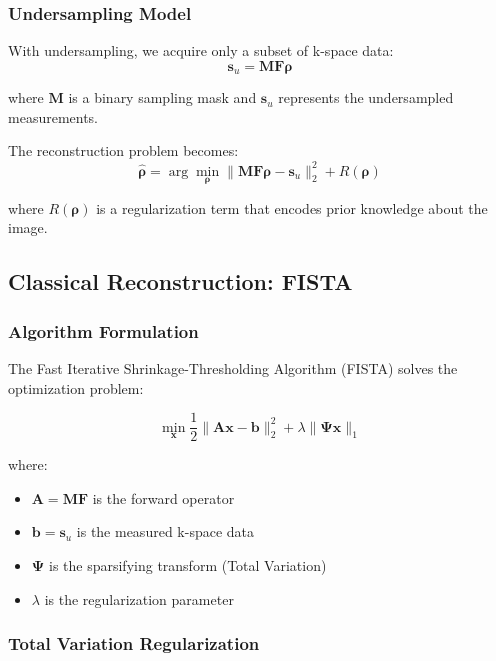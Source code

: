 \documentclass[11pt,a4paper]{article}
\begin{document}
\subsubsection{Undersampling Model}

With undersampling, we acquire only a subset of k-space data:
\begin{equation}
\mathbf{s}_u = \mathbf{M} \mathbf{F} \boldsymbol{\rho}
\end{equation}

where $\mathbf{M}$ is a binary sampling mask and $\mathbf{s}_u$ represents the undersampled measurements.

The reconstruction problem becomes:
\begin{equation}
\hat{\boldsymbol{\rho}} = \arg\min_{\boldsymbol{\rho}} \|\mathbf{M} \mathbf{F} \boldsymbol{\rho} - \mathbf{s}_u\|_2^2 + R(\boldsymbol{\rho})
\end{equation}

where $R(\boldsymbol{\rho})$ is a regularization term that encodes prior knowledge about the image.

\subsection{Classical Reconstruction: FISTA}

\subsubsection{Algorithm Formulation}

The Fast Iterative Shrinkage-Thresholding Algorithm (FISTA) solves the optimization problem:

\begin{equation}
\min_{\mathbf{x}} \frac{1}{2}\|\mathbf{A}\mathbf{x} - \mathbf{b}\|_2^2 + \lambda \|\mathbf{\Psi x}\|_1
\end{equation}

where:
\begin{itemize}
    \item $\mathbf{A} = \mathbf{M}\mathbf{F}$ is the forward operator
    \item $\mathbf{b} = \mathbf{s}_u$ is the measured k-space data
    \item $\mathbf{\Psi}$ is the sparsifying transform (Total Variation)
    \item $\lambda$ is the regularization parameter
\end{itemize}

\subsubsection{Total Variation Regularization}
\end{document}
